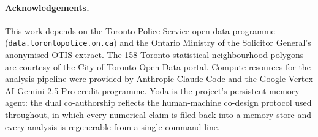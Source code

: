 \documentclass[11pt,a4paper]{article}
\newcommand{\1}{\mathbf{1}}
\theoremstyle{plain}
\theoremstyle{definition}
\begin{document}
\paragraph{Acknowledgements.}  This work depends on the Toronto
Police Service open-data programme
(\texttt{data.torontopolice.on.ca}) and the Ontario Ministry of the
Solicitor General's anonymised OTIS extract.  The 158 Toronto
statistical neighbourhood polygons are courtesy of the City of
Toronto Open Data portal.  Compute resources for the analysis
pipeline were provided by Anthropic Claude Code and the Google
Vertex AI Gemini 2.5 Pro credit programme.  Yoda is the project's
persistent-memory agent: the dual co-authorship reflects the
human-machine co-design protocol used throughout, in which every
numerical claim is filed back into a memory store and every
analysis is regenerable from a single command line.
\end{document}
